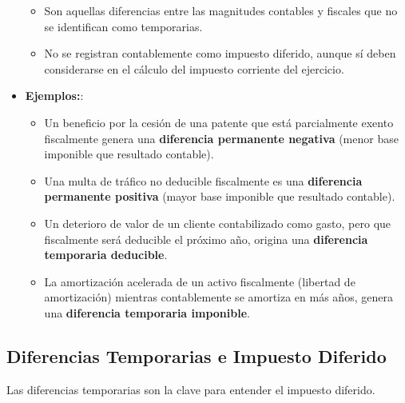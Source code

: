 \documentclass[
  paper=a4,
  ,captions=tableheading
]{scrbook}
\providecommand{\tightlist}{%
  \setlength{\itemsep}{0pt}\setlength{\parskip}{0pt}}
\begin{document}
\begin{itemize}
  \begin{itemize}
  \tightlist
  \item
    Son aquellas diferencias entre las magnitudes contables y fiscales
    que no se identifican como temporarias.
  \item
    No se registran contablemente como impuesto diferido, aunque sí
    deben considerarse en el cálculo del impuesto corriente del
    ejercicio.
  \end{itemize}
\item
  \textbf{Ejemplos:}:

  \begin{itemize}
  \tightlist
  \item
    Un beneficio por la cesión de una patente que está parcialmente
    exento fiscalmente genera una \textbf{diferencia permanente
    negativa} (menor base imponible que resultado contable).
  \item
    Una multa de tráfico no deducible fiscalmente es una
    \textbf{diferencia permanente positiva} (mayor base imponible que
    resultado contable).
  \item
    Un deterioro de valor de un cliente contabilizado como gasto, pero
    que fiscalmente será deducible el próximo año, origina una
    \textbf{diferencia temporaria deducible}.
  \item
    La amortización acelerada de un activo fiscalmente (libertad de
    amortización) mientras contablemente se amortiza en más años, genera
    una \textbf{diferencia temporaria imponible}.
  \end{itemize}
\end{itemize}

\hypertarget{diferencias-temporarias-e-impuesto-diferido}{%
\subsection{Diferencias Temporarias e Impuesto
Diferido}\label{diferencias-temporarias-e-impuesto-diferido}}

Las diferencias temporarias son la clave para entender el impuesto
diferido.
\end{document}
